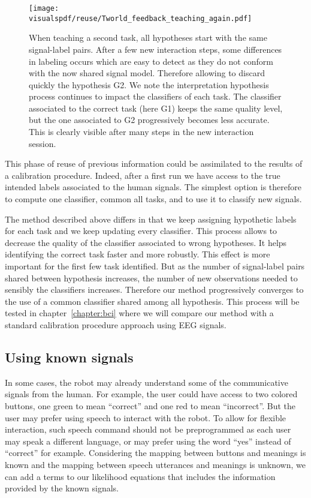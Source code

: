 \begin{figure}[!htbp]
  \centering
  \texttt{[image: \\visualspdf/reuse/Tworld\_feedback\_teaching\_again.pdf]}
  \caption{When teaching a second task, all hypotheses start with the same signal-label pairs. After a few new interaction steps, some differences in labeling occurs which are easy to detect as they do not conform with the now shared signal model. Therefore allowing to discard quickly the hypothesis G2. We note the interpretation hypothesis process continues to impact the classifiers of each task. The classifier associated to the correct task (here G1) keeps the same quality level, but the one associated to G2 progressively becomes less accurate. This is clearly visible after many steps in the new interaction session.}
  \label{fig:TworldReuse}
\end{figure}

This phase of reuse of previous information could be assimilated to the results of a calibration procedure. Indeed, after a first run we have access to the true intended labels associated to the human signals. The simplest option is therefore to compute one classifier, common all tasks, and to use it to classify new signals.

The method described above differs in that we keep assigning hypothetic labels for each task and we keep updating every classifier. This process allows to decrease the quality of the classifier associated to wrong hypotheses. It helps identifying the correct task faster and more robustly. This effect is more important for the first few task identified. But as the number of signal-label pairs shared between hypothesis increases, the number of new observations needed to sensibly the classifiers increases. Therefore our method progressively converges to the use of a common classifier shared among all hypothesis. This process will be tested in chapter~\ref{chapter:bci} where we will compare our method with a standard calibration procedure approach using EEG signals.

\subsection{Using known signals}
\label{chapter:lfui:known}

In some cases, the robot may already understand some of the communicative signals from the human. For example, the user could have access to two colored buttons, one green to mean ``correct'' and one red to mean ``incorrect''. But the user may prefer using speech to interact with the robot. To allow for flexible interaction, such speech command should not be preprogrammed as each user may speak a different language, or may prefer using the word ``yes'' instead of ``correct'' for example. Considering the mapping between buttons and meanings is known and the mapping between speech utterances and meanings is unknown, we can add a terms to our likelihood equations that includes the information provided by the known signals.

